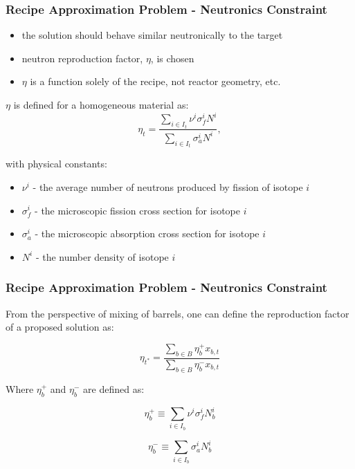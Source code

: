 \begin{frame}[ctb!]
  \frametitle{Recipe Approximation Problem - Neutronics Constraint}

  \begin{itemize}
    \item the solution should behave similar neutronically to the target
    \item neutron reproduction factor, $\eta$, is chosen
    \item $\eta$ is a function solely of the recipe, not reactor geometry, etc.
  \end{itemize}

  $\eta$ is defined for a homogeneous material as:
  \begin{equation}
    \label{eqs:eta_micro}
    \eta_t = \frac{\sum_{i \in I_t} \nu^{i} \sigma_{f}^{i} N^{i}}
        {\sum_{i \in I_t} \sigma_{a}^{i} N^{i}},
  \end{equation}

  with physical constants:
  \begin{itemize}
    \item $\nu^{i}$ - the average number of neutrons produced by fission of isotope $i$
    \item $\sigma_{f}^{i}$ - the microscopic fission cross section for isotope $i$
    \item $\sigma_{a}^{i}$ - the microscopic absorption cross section for isotope $i$
    \item $N^i$ - the number density of isotope $i$
  \end{itemize}
\end{frame}

\begin{frame}[ctb!]
  \frametitle{Recipe Approximation Problem - Neutronics Constraint}

  From the perspective of mixing of barrels, one can define the reproduction
  factor of a proposed solution as:

  \begin{equation}
    \label{eqs:eta_simple}
    \eta_{t^*} = \frac{\sum_{b \in B} \eta_{b}^{+} x_{b, t}}
        {\sum_{b \in B} \eta_{b}^{-} x_{b, t}}
  \end{equation}

  Where $\eta_b^+$ and $\eta_b^-$ are defined as:

  \begin{equation}
    \label{eqs:eta_+}
    \eta_{b}^{+} \equiv \sum_{i \in I_{b}} \nu^{i} \sigma_{f}^{i} N_{b}^{i}
  \end{equation}

  \begin{equation}
    \label{eqs:eta_-}
    \eta_{b}^{-} \equiv \sum_{i \in I_{b}} \sigma_{a}^{i} N_{b}^{i}
  \end{equation}
  
\end{frame}

